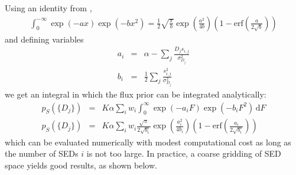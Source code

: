 \documentclass[11pt,letterpaper,linenumbers]{aastex63}
\newcommand{\dd}{\mathrm{d}}
\newcommand{\erf}{\textrm{erf}}
\begin{document}
Using an identity from \cite{gr1980},
\begin{eqnarray}
  \int_0^{-\infty} \exp(-a x) \exp(-b x^2) =
  \frac{1}{2}
  \sqrt{\frac{\pi}{b}}
  \exp\left(\frac{a^2}{4 b}\right)
  \left(1 - \erf\left(\frac{a}{2 \sqrt{b}}\right)\right)
\end{eqnarray}
and defining variables
\begin{eqnarray}
  a_i &=& \alpha - \sum_j \frac{D_j s_{i,j}}{\sigma_{D_j}^2} \\
  b_i &=& \frac{1}{2} \sum_j \frac{s_{i,j}^2}{\sigma_{D_j}^2}
\end{eqnarray}
we get an integral in which the flux prior can be integrated analytically:
%
\begin{eqnarray}
  p_S(\{ D_j \})
  &=&
  K \alpha
  \sum_i w_i 
  \int_0^{\infty}
    \exp(-a_i F) \exp(-b_i F^2)
    \, \dd F
    \\
  p_S(\{ D_j \})
  &=&
  K \alpha
  \sum_i w_i 
  \frac{\sqrt{\pi}}{2 \sqrt{b_i}}
  \exp \left(\frac{a_i^2}{4 b_i} \right)
  \left(1 - \erf\left( \frac{a_i}{2 \sqrt{b_i}} \right) \right)
  \label{eq:pfg}
\end{eqnarray}
which can be evaluated numerically with modest computational cost as
long as the number of SEDs $i$ is not too large.  In practice, a
coarse gridding of SED space yields good results, as shown below.


\end{document}
